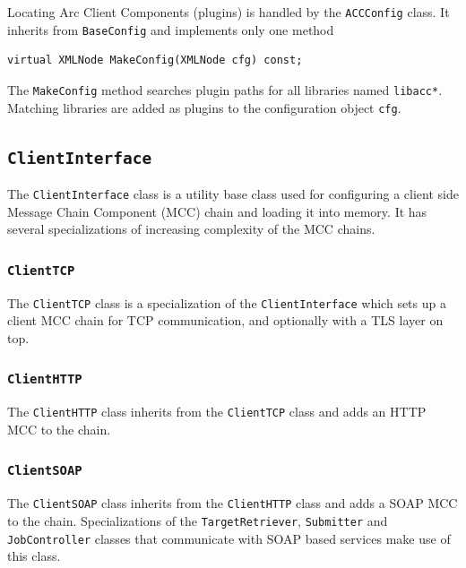 \documentclass{book}
\newcommand{\ACCConfig}{\texttt{ACCConfig}}
\newcommand{\ClientInterface}{\texttt{ClientInterface}}
\newcommand{\ClientTCP}{\texttt{ClientTCP}}
\newcommand{\ClientHTTP}{\texttt{ClientHTTP}}
\newcommand{\ClientSOAP}{\texttt{ClientSOAP}}
\newcommand{\JobController}{\texttt{JobController}}
\newcommand{\TargetRetriever}{\texttt{TargetRetriever}}
\newcommand{\Submitter}{\texttt{Submitter}}
\begin{document}
Locating Arc Client Components (plugins) is handled by the
{\ACCConfig} class. It inherits from \texttt{BaseConfig} and
implements only one method

\begin{shaded}
\begin{verbatim}
virtual XMLNode MakeConfig(XMLNode cfg) const;
\end{verbatim}
\end{shaded}

The \texttt{MakeConfig} method searches plugin paths for all libraries
named \texttt{libacc*}. Matching libraries are added as plugins to the
configuration object \texttt{cfg}.

\subsection{{\ClientInterface}}

The {\ClientInterface} class is a utility base class used for
configuring a client side Message Chain Component (MCC) chain and
loading it into memory. It has several specializations of increasing
complexity of the MCC chains.

\subsubsection{{\ClientTCP}}

The {\ClientTCP} class is a specialization of the {\ClientInterface}
which sets up a client MCC chain for TCP communication, and optionally
with a TLS layer on top.

\subsubsection{{\ClientHTTP}}

The {\ClientHTTP} class inherits from the {\ClientTCP} class and adds
an HTTP MCC to the chain.

\subsubsection{{\ClientSOAP}}

The {\ClientSOAP} class inherits from the {\ClientHTTP} class and adds
a SOAP MCC to the chain. Specializations of the {\TargetRetriever},
{\Submitter} and {\JobController} classes that communicate with SOAP
based services make use of this class.
\end{document}

